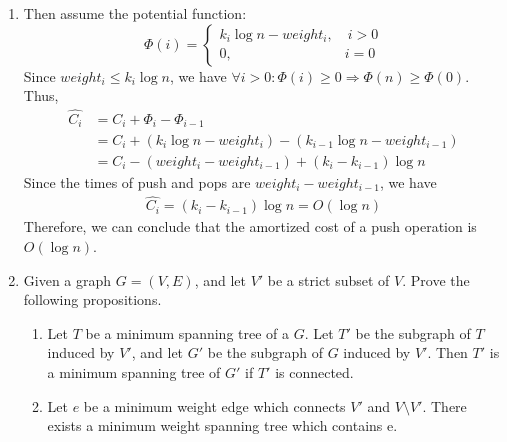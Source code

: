 \documentclass[12pt,a4paper]{article}
\makeatletter
\newtheorem*{solution}{Solution}
\theoremstyle{definition}
\renewenvironment{solution}[1][Solution] {\par\pushQED{\qed}\normalfont\topsep6\p@\@plus6\p@\relax\trivlist\item[\hskip\labelsep\bfseries#1\@addpunct{.}]\ignorespaces}{\popQED\endtrivlist\@endpefalse} \makeatother
\makeatother
\begin{document}
\begin{enumerate}
\begin{solution}
\begin{enumerate}
			Then assume the potential function: 
			$$
			\Phi(i)=\begin{cases}
			k_i\log n- weight_i\nonumber,\quad i>0\\
			0,\quad\quad\quad\quad\quad\quad\quad\quad i=0
			\end{cases}
			$$
			Since $weight_i\leq k_i\log n$, we have $ \forall i >0: \Phi(i)\geq 0\Rightarrow\Phi(n)\geq\Phi(0)$.
			Thus,
			\begin{align*}
				\hat{C_i} &= C_i + \Phi_i - \Phi_{i - 1}\\
					      &= C_i + (k_i\log n- weight_i) - (k_{i-1}\log n- weight_{i - 1})\\
					      &= C_i - (weight_{i} - weight_{i - 1}) + (k_{i} - k_{i - 1})\log n
			\end{align*}
			Since the times of push and pops are $weight_i-weight_{i-1}$, we have
			\begin{align*}
			\hat{C_i} =  (k_{i} - k_{i - 1})\log n = O(\log n)
			\end{align*}
			Therefore, we can conclude that the amortized cost of a push operation is $O(\log n)$.
		\end{enumerate}
	\end{solution}
	
	\item Given a graph $G = (V, E)$, and let $V'$ be a strict subset of $V$. Prove the following propositions.
	
	\begin{enumerate}
		\item Let $T$ be a minimum spanning tree of a $G$. Let $T'$ be the subgraph of $T$ induced by $V'$, and let $G'$ be the subgraph of $G$ induced by $V'$. Then $T'$ is a minimum spanning tree of $G'$ if $T'$ is connected.
		\item Let $e$ be a minimum weight edge which connects $V'$ and $V \setminus V'$. There exists a minimum weight spanning tree which contains e.
	\end{enumerate}
	

\end{enumerate}
\end{document}
